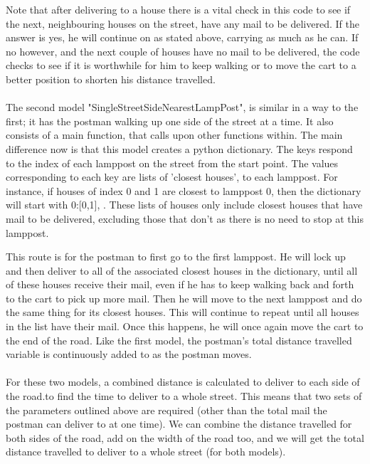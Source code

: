 \documentclass[14pt]{article}
\begin{document}
Note that after delivering to a house there is a vital check in this code to see if the next, neighbouring houses on the street, have any mail to be delivered. If the answer is yes, he will continue on as stated above, carrying as much as he can. If no however, and the next couple of houses have no mail to be delivered, the code checks to see if it is worthwhile for him to keep walking or to move the cart to a better position to shorten his distance travelled. \\
\\
The second model "SingleStreetSideNearestLampPost", is similar in a way to the first; it has the postman walking up one side of the street at a time. It also consists of a main function, that calls upon other functions within. The main difference now is that this model creates a python dictionary. The keys respond to the index of each lamppost on the street from the start point. The values corresponding to each key are lists of 'closest houses', to each lamppost. For instance, if houses of index 0 and 1 are closest to lamppost 0, then the dictionary will start with {0:[0,1], }. These lists of houses only include closest houses that have mail to be delivered, excluding those that don't as there is no need to stop at this lamppost. 

This route is for the postman to first go to the first lamppost. He will lock up and then deliver to all of the associated closest houses in the dictionary, until all of these houses receive their mail, even if he has to keep walking back and forth to the cart to pick up more mail. Then he will move to the next lamppost and do the same thing for its closest houses. This will continue to repeat until  all houses in the list have their mail. Once this happens, he will once again move the cart to the end of the road. Like the first model, the postman's total distance travelled variable is continuously added to as the postman moves. \\
\\
For these two models, a combined distance is calculated to deliver to each side of the road.to find the time to deliver to a whole street. This means that two sets of the parameters outlined above are required (other than the total mail the postman can deliver to at one time). We can combine the distance travelled for both sides of the road, add on the width of the road too, and we will get the total distance travelled to deliver to a whole street (for both models). \\
\\
\end{document}
